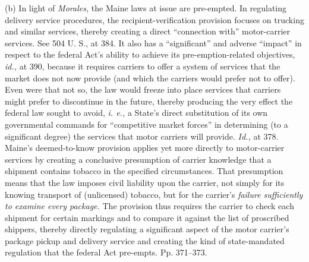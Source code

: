   (b) In light of \emph{Morales,} the Maine laws at issue are pre-empted.
In regulating delivery service procedures, the recipient-verification
provision focuses on trucking and similar services, thereby creating
a direct ``connection with'' motor-carrier services. See 504
U. S., at 384. It also has a ``significant'' and adverse
``impact'' in respect to the federal Act's ability to achieve
its pre-emption-related objectives, \emph{id.,} at 390, because it
requires carriers to offer a system of services that the market does
not now provide (and which the carriers would prefer not to offer).
Even were that not so, the law would freeze into place services that
carriers might prefer to discontinue in the future, thereby producing
the very effect the federal law sought to avoid, \emph{i. e.,} a State's
direct substitution of its own governmental commands for ``competitive
market forces'' in determining (to a significant degree) the services
that motor carriers will provide. \emph{Id.,} at 378. Maine's
deemed-to-know provision applies yet more directly to motor-carrier
services by creating a conclusive presumption of carrier knowledge
that a shipment contains tobacco in the specified circumstances. That
presumption means that the law imposes civil liability upon the carrier,
not simply for its knowing transport of (unlicensed) tobacco, but for
the carrier's \emph{failure sufficiently to examine every package.}
The provision thus requires the carrier to check each shipment for
certain markings and to compare it against the list of proscribed
shippers, thereby directly regulating a significant aspect of the motor
carrier's package pickup and delivery service and creating the kind
of state-mandated regulation that the federal Act pre-empts. Pp.
371--373.

